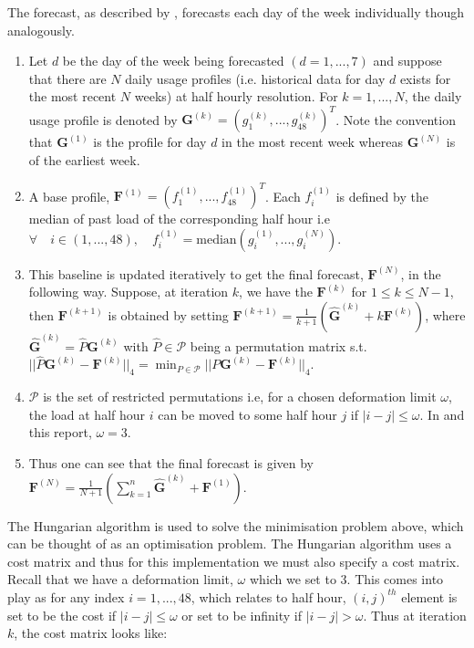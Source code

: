 The forecast, as described by \cite{dan14}, forecasts each day of the week individually though analogously.
\begin{enumerate}[label=\roman*)]
\item Let $d$ be the day of the week being forecasted $(d=1,...,7)$ and suppose that there are $N$ daily usage profiles (i.e. historical data for day $d$ exists for the most recent $N$ weeks) at half hourly resolution. For $k = 1, ..., N$, the daily usage profile is denoted by $\boldsymbol{G}^{(k)} = (g_1^{(k)}, ... , g_{48}^{(k)})^T$. Note the convention that $\boldsymbol{G}^{(1)}$ is the profile for day $d$ in the most recent week whereas $\boldsymbol{G}^{(N)}$ is of the earliest week.
\item A base profile, $\boldsymbol{F}^{(1)} = \left(f_1^{(1)}, ... , f_{48}^{(1)} \right)^T$. Each $f_i^{(1)}$ is defined by the median of past load of the corresponding half hour i.e $ \forall \quad i \in (1, ..., 48), \quad f_i^{(1)} = \text{median}(g_i^{(1)}, ..., g_i^{(N)})$.
\item This baseline is updated iteratively to get the final forecast, $\boldsymbol{F}^{(N)}$, in the following way. Suppose, at iteration $k$, we have the $\boldsymbol{F}^{(k)}$ for $1 \le k \le N-1$, then $\boldsymbol{F}^{(k+1)}$ is obtained by setting $\boldsymbol{F}^{(k+1)} = \frac{1}{k+1} \left( \boldsymbol{\hat{G}}^{(k)} + k \boldsymbol{F}^{(k)}\right)$, where $\boldsymbol{\hat{G}}^{(k)} = \hat{P}\boldsymbol{G}^{(k)}$ with $\hat{P} \in  \mathscr{P}$ being a permutation matrix s.t. $||\hat{P}\boldsymbol{G}^{(k)} - \boldsymbol{F}^{(k)}||_4 = \displaystyle \min_{P \in \mathscr{P}}||P\boldsymbol{G}^{(k)} - \boldsymbol{F}^{(k)}||_4 $.
\item $\mathscr{P}$ is the set of restricted permutations i.e, for a chosen deformation limit $\omega$, the load at half hour $i$ can be moved to some half hour $j$ if $|i-j| \le \omega$. In \cite{dan14} and this report, $\omega=3$.
\item Thus one can see that the final forecast is given by $\boldsymbol{F}^{(N)} = \frac{1}{N+1}\left(\displaystyle \sum_{k=1}^n \boldsymbol{\hat{G}}^{(k)} + \boldsymbol{F}^{(1)} \right)$.
\end{enumerate}

The Hungarian algorithm is used to solve the minimisation problem above, which can be thought of as an optimisation problem. The Hungarian algorithm uses a cost matrix and thus for this implementation we must also specify a cost matrix. Recall that we have a deformation limit, $\omega$ which we set to 3. This comes into play as for any index $i = 1, ..., 48$, which relates to half hour, $(i,j)^{th}$ element is set to be the cost if $|i-j|\le\omega$ or set to be infinity if $|i-j| > \omega$. Thus at iteration $k$, the cost matrix looks like: \newline

